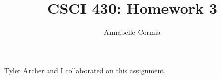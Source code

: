 \documentclass[12pt]{article}
\author{Annabelle Cormia}
\title{CSCI 430: Homework 3}
\begin{document}
\maketitle

Tyler Archer and I collaborated on this assignment.\\

    
\end{document}
